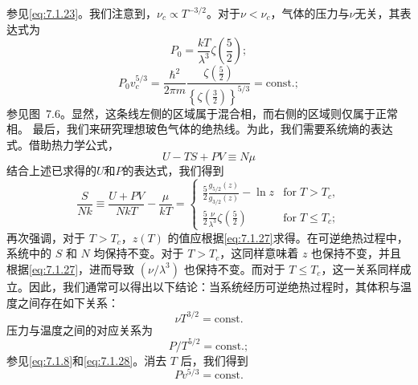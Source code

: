 参见\autoref{eq:7.1.23}。我们注意到，\(\nu_{c} \propto T^{-3/2}\)。对于\(\nu < \nu_{c}\)，气体的压力与\(\nu\)无关，其表达式为
\begin{equation}\tag{7.1.42}\label{eq:7.1.42}
P _ { 0 } = \frac { k T } { \lambda ^{3} } \zeta \left( \frac { 5 } { 2 } \right) ;
\end{equation}
\begin{equation}\tag{7.1.43}\label{eq:7.1.43}
P _ { 0 } v _ { c } ^{5 / 3} = \frac { \hbar ^{2} } { 2 \pi m } \frac { \zeta \left( \frac { 5 } { 2 } \right) } { \left\{ \zeta \left( \frac { 3 } { 2 } \right) \right\} ^{5 / 3} } = \mathrm { c o n s t . } ;
\end{equation}
参见图~7.6。显然，这条线左侧的区域属于混合相，而右侧的区域则仅属于正常相。
最后，我们来研究理想玻色气体的绝热线。为此，我们需要系统熵的表达式。借助热力学公式，
\begin{equation}\tag{7.1.44}\label{eq:7.1.44}
U - T S + P V \equiv N \mu
\end{equation}
结合上述已求得的\(U\)和\(P\)的表达式，我们得到
\begin{equation}\tag{7.1.45}\label{eq:7.1.45}
\frac { S } { N k } \equiv \frac { U + P V } { N k T } - \frac { \mu } { k T } = \left\{ \begin{array}{ll} { \frac { 5 } { 2 } \frac { g _ { 5 / 2 } ( z ) } { g _ { 3 / 2 } ( z ) } - \ln z } & { \mathrm { f o r } \; T > T _ { c } , } \\{ \frac { 5 } { 2 } \frac { \nu } { \lambda ^{3} } \zeta \left( \frac { 5 } { 2 } \right) } & { \mathrm { f o r } \; T \leq T _ { c } ; } \end{array} \right.
\end{equation}
再次强调，对于 \(T > T_c\)，\(z(T)\) 的值应根据\autoref{eq:7.1.27}求得。在可逆绝热过程中，系统中的 \(S\) 和 \(N\) 均保持不变。对于 \(T > T_c\)，这同样意味着 \(z\) 也保持不变，并且根据\autoref{eq:7.1.27}，进而导致 \((\nu/\lambda^3)\) 也保持不变。而对于 \(T \leq T_c\)，这一关系同样成立。因此，我们通常可以得出以下结论：当系统经历可逆绝热过程时，其体积与温度之间存在如下关系：
\begin{equation}\tag{7.1.46}\label{eq:7.1.46}
\nu T ^{3 / 2} = \mathrm { c o n s t . }
\end{equation}
压力与温度之间的对应关系为
\begin{equation}\tag{7.1.47}\label{eq:7.1.47}
P / T ^{5 / 2} = \mathrm { c o n s t . } ;
\end{equation}
参见\autoref{eq:7.1.8}和\autoref{eq:7.1.28}。消去 \(T\) 后，我们得到
\begin{equation}\tag{7.1.48}\label{eq:7.1.48}
P v ^{5 / 3} = \mathrm { c o n s t . }
\end{equation}
